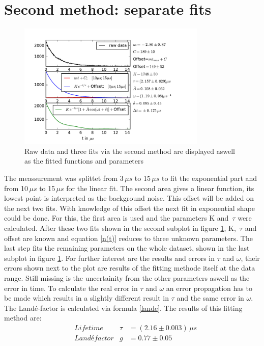 \documentclass{include/thesisclass3}
\newcommand{\e}[1]{\,\si{#1}}
\begin{document}
\section{Second method: separate fits}
\label{second}
\begin{figure}[H]
	\begin{center}
		\includegraphics[width=0.8\textwidth]{images/plot2.pdf}
		\caption{Raw data and three fits via the second method are displayed aswell as the fitted functions and parameters}
		\label{method2}
	\end{center}
\end{figure}
The meassurement was splittet from 3$\e{\mu s}$ to 15$\e{\mu s}$ to fit the exponential part and from 10$\e{\mu s}$ to 15$\e{\mu s}$ for the linear fit.
The second area gives a linear function, its lowest point is interpreted as the background noise. This offset will be added on the next two fits. With knowledge of this offset the next fit in exponential shape could be done. For this, the first area is used and the parameters K and $\e{\tau}$ were calculated. After these two fits shown in the second subplot in figure \ref{method2}, K, $\e{\tau}$ and offset are known and equation \ref{n(t)} reduces to three unknown parameters. The last step fits the remaining parameters on the whole dataset, shown in the last subplot in figure \ref{method2}. For further interest are the results and errors in $\tau$ and $\omega$, their errors shown next to the plot are results of the fitting methode itself at the data range. Still missing is the uncertainity from the other parameters aswell as the error in time. To calculate the real error in $\tau$ and $\omega$ an error propagation has to be made which results in a slightly different result in $\tau$ and the same error in $\omega$. The Landé-factor is calculated via formula \ref{lande}. The results of this fitting method are:
\begin{align}
&\e{Lifetime} &\tau &=(2.16\pm 0.003)\e{\mu s}\\
&\e{Landé factor} &g &=0.77 \pm 0.05
\end{align}
\end{document}
